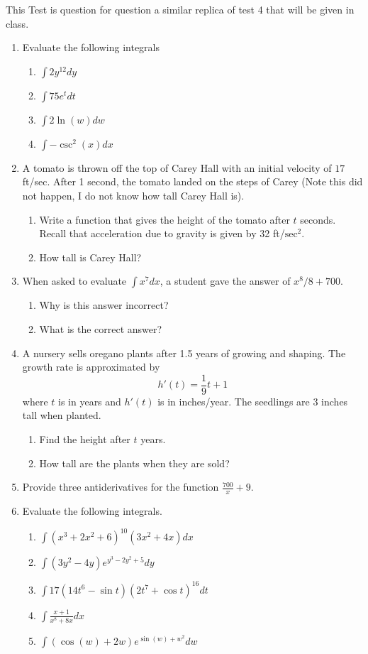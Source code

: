 \documentclass[12pt]{article}
\begin{document}
This Test is question for question a similar replica of test 4 that will be given in class. 
\begin{enumerate}
\item Evaluate the following integrals
\begin{enumerate}
\item $\int 2 y^{12}dy$
\item $\int 75e^{t}dt$
\item $\int 2\ln(w)dw$
\item $\int -\csc^2(x)dx$
\end{enumerate}
\item A tomato is thrown off the top of Carey Hall with an initial velocity of $17$ ft/sec. After 1 second, the tomato landed on the steps of Carey (Note this did not happen, I do not know how tall Carey Hall is). 
\begin{enumerate}
\item Write a function that gives the height of the tomato after $t$ seconds. Recall that acceleration due to gravity is given by 32 ft/$\text{sec}^2$. 
\item How tall is Carey Hall?
\end{enumerate}
\item When asked to evaluate $\int x^7dx$, a student gave the answer of $x^8/8+700$. 
\begin{enumerate}
\item Why is this answer incorrect?
\item What is the correct answer?
\end{enumerate}
\item A nursery sells oregano plants after 1.5 years of growing and shaping. The growth rate is approximated by 
\[h'(t)=\frac{1}{9}t+1\] where $t$ is in years and $h'(t)$ is in inches/year. The seedlings are 3 inches tall when planted.
\begin{enumerate}
\item Find the height after $t$ years. 
\item How tall are the plants when they are sold?
\end{enumerate}
\item Provide three antiderivatives for the function $\frac{700}{x}+9$. 
\item Evaluate the following integrals. 
\begin{enumerate}
\item $\int(x^3+2x^2+6)^{10}(3x^2+4x)dx$
\item $\int(3y^2-4y)e^{y^3-2y^2+5}dy$
\item $\int17(14t^6 -\sin t)(2t^7+\cos t)^{16}dt$
\item $\int\frac{x+1}{x^8+8x}dx$
\item $\int(\cos(w)+2w)e^{\sin(w)+w^2}dw$
\end{enumerate}
\end{enumerate}
\end{document}
